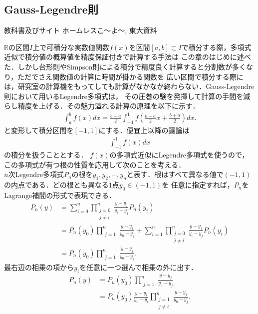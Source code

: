 \documentclass[a4j,papersize,disablejfam,slide,14pt]{jsarticle}
\begin{document}
\subsection{{\rm Gauss-Legendre}則}
	\begin{itembox}[l]{教科書及びサイト}
    	{\rm ホームレスこ～よ～\cite{gauss_legendre}, 東大資料\cite{u_tokyo_legendre}}
    \end{itembox}
	$\mathbb{R}$の区間$I$上で可積分な実数値関数$f(x)$を区間$[a,b] \subset I$で積分する際，多項式近似で積分値の概算値を精度保証付きで計算する手法は
    この章のはじめに述べた．しかし台形則や{\rm Simpson}則による積分で精度良く計算すると分割数が多くなり，ただでさえ関数値の計算に時間が掛かる関数を
    広い区間で積分する際には，研究室の計算機をもってしても計算がなかなか終わらない．{\rm Gauss-Legendre}則において用いる{\rm Legendre}多項式は，
    その圧巻の験を発揮して計算の手間を減らし精度を上げる．その魅力溢れる計算の原理を以下に示す．
    \begin{align}
    	\int_{a}^{b} f(x) dx = \frac{b-a}{2} \int_{-1}^{1} f\left( \frac{b-a}{2}x + \frac{b+a}{2} \right) dx.
    \end{align}
    と変形して積分区間を$[-1, 1]$にする．便宜上以降の議論は
    \begin{align}
    	\int_{-1}^{1} f(x) dx
    \end{align}
    の積分を扱うこととする．
    $f(x)$の多項式近似に{\rm Legendre}多項式を使うので，この多項式が有つ根の性質を応用して次のことを考える．\\
    $n$次{\rm Legendre}多項式$P_n$の根を$y_1, y_2, \cdots, y_n$と表す．根はすべて異なる値で$(-1, 1)$の内点である．どの根とも異なる$1$点$y_0 \in (-1, 1)$を
    任意に指定すれば，$P_n$を{\rm Lagrange}補間の形式で表現できる．
    \begin{align}
    	P_n(y) &= \sum_{i=0}^{n} \prod_{\substack{j=0\\j \neq i}}^{n} \frac{y-y_j}{y_i - y_j} P_n(y_i) \\
        &= P_n(y_0) \prod_{\substack{j=1}}^{n} \frac{y-y_j}{y_0 - y_j} + \sum_{i=1}^{n} \prod_{\substack{j=0\\j \neq i}}^{n} \frac{y-y_j}{y_i - y_j} P_n(y_i) \\
        &= P_n(y_0) \prod_{\substack{j=1}}^{n} \frac{y-y_j}{y_0 - y_j}.
    \end{align}
    最右辺の相乗の項から$y_i$を任意に一つ選んで相乗の外に出す．
    \begin{align}
    	P_n(y) &= P_n(y_0) \prod_{\substack{j=1}}^{n} \frac{y-y_j}{y_0 - y_j} \\
        &= P_n(y_0) \frac{y - y_i}{y_0 - y_i} \prod_{\substack{j=1 \\ j \neq i}}^{n} \frac{y-y_j}{y_0 - y_j}.
    \end{align}
\end{document}
